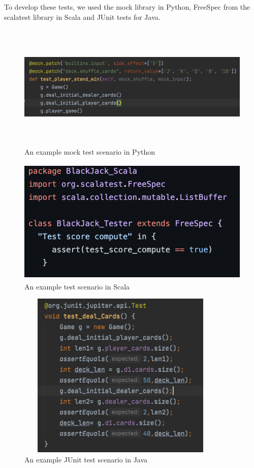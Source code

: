 \documentclass[12pt]{article}
\begin{document}
To develop these tests, we used the mock library in Python, FreeSpec from the scalatest library in Scala and JUnit tests for Java.

\begin{figure}[h] 
\centering
\includegraphics[height=6cm, width=15cm]{PythonMock.png}
\caption{An example mock test scenario in Python}
\end{figure}

\begin{figure}[h] 
\centering
\includegraphics[height=6cm, width=15cm]{ScalaTest.png}
\caption{An example test scenario in Scala}
\end{figure}
\pagebreak

\begin{figure}[h] 
\centering
\includegraphics[height=8cm, width=10cm]{JavaTest.png}
\caption{An example JUnit test scenario in Java}
\end{figure}
\end{document}
